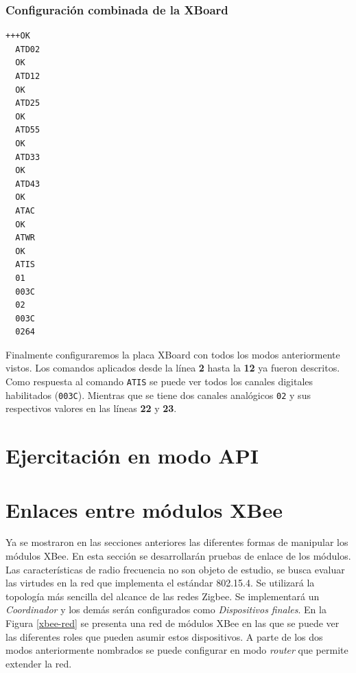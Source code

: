 \documentclass[11pt,oneside,spanish,a4paper]{article}
\begin{document}
\subsubsection{Configuración combinada de la XBoard}

\noindent\begin{minipage}{.35\textwidth}
\begin{lstlisting}[emph={+++,ATIS,ATD02,ATD12,ATD25,ATD55,ATD33,ATD43,ATWR,ATAC},
emphstyle={\color{blue}}, caption={GPIO de la placa XBoard.},label=code:completo]
  +++OK
  ATD02
  OK
  ATD12
  OK
  ATD25
  OK
  ATD55
  OK
  ATD33
  OK
  ATD43
  OK
  ATAC
  OK
  ATWR
  OK
  ATIS
  01
  003C
  02
  003C
  0264
\end{lstlisting}  
\end{minipage}\hfill
\begin{minipage}{.60\textwidth}
Finalmente configuraremos la placa XBoard con todos los modos
anteriormente vistos. Los comandos aplicados desde la línea \textbf{2}
hasta la \textbf{12} ya fueron descritos. Como respuesta al comando
\texttt{ATIS} se puede ver todos los canales digitales habilitados
(\texttt{003C}). Mientras que se tiene dos canales analógicos
\texttt{02} y sus respectivos valores en las líneas \textbf{22} y
\textbf{23}.
\end{minipage}
\section{Ejercitación en modo API}
\label{sec:API}
\newpage{}

\section{Enlaces entre módulos XBee}
\label{sec:enlace}

Ya se mostraron en las secciones anteriores las diferentes formas de
manipular los módulos XBee. En esta sección se desarrollarán pruebas
de enlace de los módulos. Las características de radio frecuencia no
son objeto de estudio, se busca evaluar las virtudes en la red que
implementa el estándar 802.15.4. Se utilizará la topología más
sencilla del alcance de las redes Zigbee. Se implementará un
\emph{Coordinador} y los demás serán configurados como
\emph{Dispositivos finales}. En la Figura \ref{xbee-red} se presenta
una red de módulos XBee en las que se puede ver las diferentes
roles que pueden asumir estos dispositivos. A parte de los dos modos
anteriormente nombrados se puede configurar en modo \emph{router} que
permite extender la red. 
\end{document}
